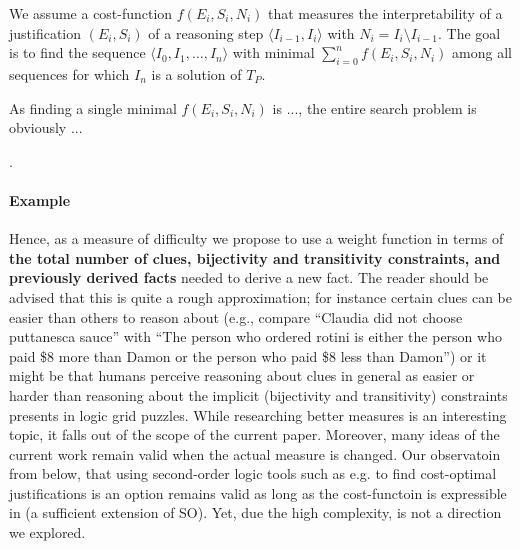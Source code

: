 We assume a cost-function $f(E_i,S_i,N_i)$ that measures the interpretability of a justification $(E_i,S_i)$ of a reasoning step $\langle I_{i-1}, I_i \rangle$ with $N_i = I_i \setminus I_{i-1}$. The goal is to find the sequence $\langle I_0, I_1, \ldots, I_n \rangle$ with minimal $\sum_{i=0}^n f(E_i,S_i,N_i)$ among all sequences for which $I_n$ is a solution of $T_P$.

As finding a single minimal $f(E_i,S_i,N_i)$ is ..., the entire search problem is obviously ...

.

\paragraph{Example} 
Hence, as a measure of difficulty we propose to use a weight function in terms of \textbf{the total number of clues, bijectivity and transitivity constraints, and previously derived facts} needed to derive a new fact. 
The reader should be advised that this is quite a rough approximation; for instance certain clues can be easier than others to reason about (e.g., compare ``Claudia did not choose puttanesca sauce'' with ``The person who ordered rotini is either the person who paid \$8 more than Damon or the person who paid \$8 less than Damon'') or it might be that humans perceive reasoning about clues in general as easier or harder than reasoning about the implicit (bijectivity and transitivity) constraints presents in logic grid puzzles. While researching better measures is an interesting topic, it falls out of the scope of the current paper. Moreover, many ideas of the current work remain valid when the actual measure is changed. 
Our observatoin from below, that using second-order logic tools such as e.g. \cite{proB,kr/BogaertsTS16} to find cost-optimal justifications is an option remains valid as long as the cost-functoin is expressible in (a sufficient extension of SO). Yet, due the high complexity, is not a direction we explored. 

